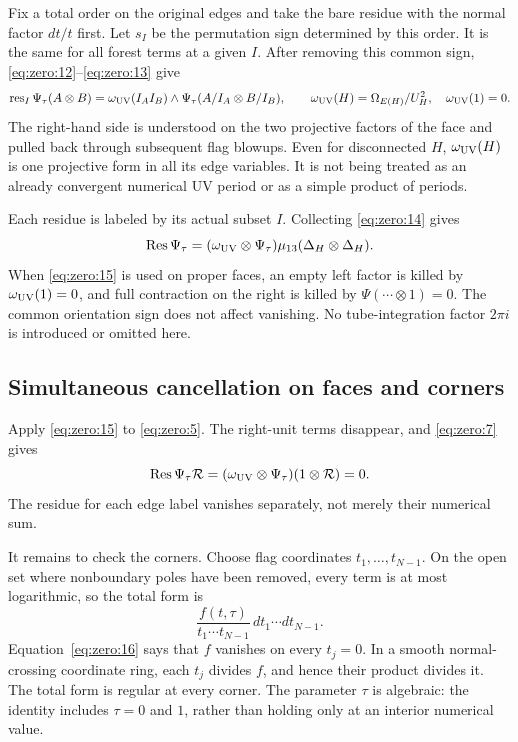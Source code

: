 \documentclass[11pt,a4paper,oneside]{article}
\theoremstyle{plain}
\theoremstyle{definition}
\theoremstyle{remark}
\numberwithin{equation}{section}
\begin{document}
Fix a total order on the original edges and take the bare residue with the normal factor $dt/t$ first. Let \(s_I\) be the permutation sign determined by this order. It is the same for all forest terms at a given $I$. After removing this common sign, \eqref{eq:zero:12}--\eqref{eq:zero:13} give
\begin{equation}
\operatorname{res}_I\Psi_\tau(A\otimes B)
 =\omega_{\rm UV}(I_A I_B)\wedge
             \Psi_\tau(A/I_A\otimes B/I_B),\qquad
 \omega_{\rm UV}(H)=\Omega_{E(H)}/U_H^2,\quad\omega_{\rm UV}(1)=0.       \label{eq:zero:14}
\end{equation}
The right-hand side is understood on the two projective factors of the face and pulled back through subsequent flag blowups. Even for disconnected $H$, $\omega_{\rm UV}(H)$ is one projective form in all its edge variables. It is not being treated as an already convergent numerical UV period or as a simple product of periods.

Each residue is labeled by its actual subset $I$. Collecting \eqref{eq:zero:14} gives
\begin{equation}
\operatorname{Res}\Psi_\tau
   =(\omega_{\rm UV}\otimes\Psi_\tau)
                         \mu_{13}(\Delta_H\otimes\Delta_H).   \label{eq:zero:15}
\end{equation}
When \eqref{eq:zero:15} is used on proper faces, an empty left factor is killed by $\omega_{\rm UV}(1)=0$, and full contraction on the right is killed by $\Psi(\cdots\otimes1)=0$. The common orientation sign does not affect vanishing. No tube-integration factor $2\pi i$ is introduced or omitted here.

\subsection{Simultaneous cancellation on faces and corners}\label{sec:zero:6}
Apply \eqref{eq:zero:15} to \eqref{eq:zero:5}. The right-unit terms disappear, and \eqref{eq:zero:7} gives
\begin{equation}
\operatorname{Res}\Psi_\tau\mathcal R
 =(\omega_{\rm UV}\otimes\Psi_\tau)(1\otimes\mathcal R)=0.       \label{eq:zero:16}
\end{equation}
The residue for each edge label vanishes separately, not merely their numerical sum.

It remains to check the corners. Choose flag coordinates \(t_1,\ldots,t_{N-1}\). On the open set where nonboundary poles have been removed, every term is at most logarithmic, so the total form is
\begin{equation}
\frac{f(t,\tau)}{t_1\cdots t_{N-1}}\,
                 dt_1\cdots dt_{N-1}.
\end{equation}
Equation~\eqref{eq:zero:16} says that $f$ vanishes on every \(t_j=0\). In a smooth normal-crossing coordinate ring, each \(t_j\) divides $f$, and hence their product divides it. The total form is regular at every corner. The parameter \(\tau\) is algebraic: the identity includes \(\tau=0\) and $1$, rather than holding only at an interior numerical value.
\end{document}
